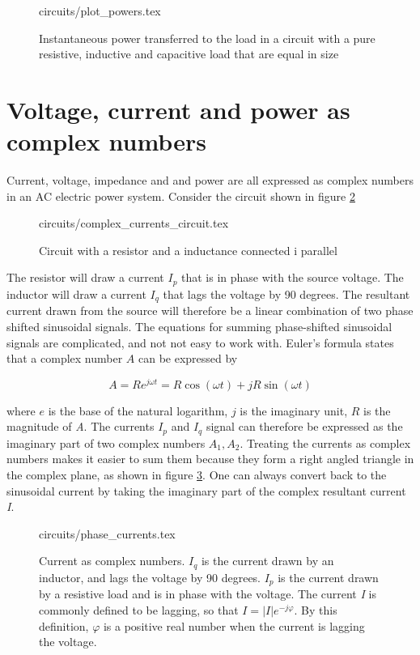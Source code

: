 \documentclass[class=book, crop=false]{standalone}
\begin{document}
\begin{figure}[ht!]
    \center
    {circuits/plot_powers.tex}
    \caption[size = 9]
    {Instantaneous power transferred to the load in a circuit with a pure resistive, inductive and capacitive load that are equal in size}\label{fig:theory:reactive_powers}
\end{figure}


\section{Voltage, current and power as complex numbers}

Current, voltage, impedance and and power are all expressed as complex numbers in an AC electric power system. Consider the circuit shown in figure \ref{fig:theory:complex_current_circuit}
\begin{figure}[ht!]
    \center
    {circuits/complex_currents_circuit.tex}
    \caption[size = 9]
    {Circuit with a resistor and a inductance connected i parallel}\label{fig:theory:complex_current_circuit}
\end{figure}
The resistor will draw a current $I_{p}$ that is in phase with the source voltage. The inductor will draw a current $I_{q}$ that lags the voltage by 90 degrees. The resultant current drawn from the source will therefore be a linear combination of two phase shifted sinusoidal signals. The equations for summing phase-shifted sinusoidal signals are complicated, and not not easy to work with. Euler's formula states that a complex number $A$ can be expressed by

\begin{equation}\label{eq:eulers_equation}
    A = Re^{j\omega t} = R\cos{(\omega t)} + jR\sin{(\omega t)}
\end{equation}

where $e$ is the base of the natural logarithm, $j$ is the imaginary unit, $R$ is the magnitude of \textit{A}. The currents $I_{p}$ and $I_{q}$ signal can therefore be expressed as the imaginary part of two complex numbers $A_{1}, A_{2}$. Treating the currents as complex numbers makes it easier to sum them because they form a right angled triangle in the complex plane, as shown in figure \ref{fig:theory:phase_current}. One can always convert back to the sinusoidal current by taking the imaginary part of the complex resultant current \textit{I}.

\begin{figure}[ht!]
    \center
    {circuits/phase_currents.tex}
    \caption[size = 9]
    {Current as complex numbers. $I_{q}$ is the current drawn by an inductor, and lags the voltage by 90 degrees. $I_{p}$ is the current drawn by a resistive load and is in phase with the voltage. The current \textit{I} is commonly defined to be lagging, so that $I = |I|e^{-j\varphi}$. By this definition, $\varphi$ is a positive real number when the current is lagging the voltage.   }\label{fig:theory:phase_current}
\end{figure}
\end{document}
